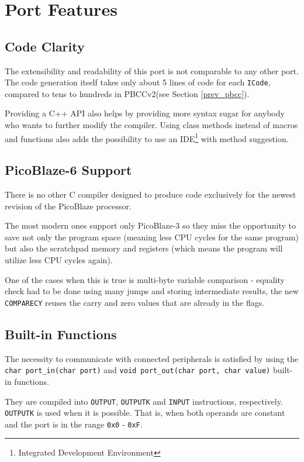 \chapter{Port Features}\label{features}

    \section{Code Clarity}

    The extensibility and readability of this port is not comparable to any other port. The code generation itself takes only about 5 lines of code for each \texttt{ICode}, compared to tens to hundreds in PBCCv2(see Section \ref{prev_pbcc}).

    Providing a C++ API also helps by providing more syntax sugar for anybody who wants to further modify the compiler. Using class methods instead of macros and functions also adds the possibility to use an IDE\footnote{Integrated Development Environment} with method suggestion.

    \section{PicoBlaze-6 Support}

    There is no other C compiler designed to produce code exclusively for the newest revision of the PicoBlaze processor.

    The most modern ones support only PicoBlaze-3 so they miss the opportunity to save not only the program space (meaning less CPU cycles for the same program) but also the scratchpad memory and registers (which means the program will utilize less CPU cycles again).

    One of the cases when this is true is multi-byte variable comparison - equality check had to be done using many jumps and storing intermediate results, the new \texttt{COMPARECY} reuses the carry and zero values that are already in the flags.

    \section{Built-in Functions}

    The necessity to communicate with connected peripherals is satisfied by using the \texttt{char port\_in(char port)} and \texttt{void port\_out(char port, char value)} built-in functions.

    They are compiled into \texttt{OUTPUT}, \texttt{OUTPUTK} and \texttt{INPUT} instructions, respectively. \texttt{OUTPUTK} is used when it is possible. That is, when both operands are constant and the port is in the range \texttt{0x0} - \texttt{0xF}.

